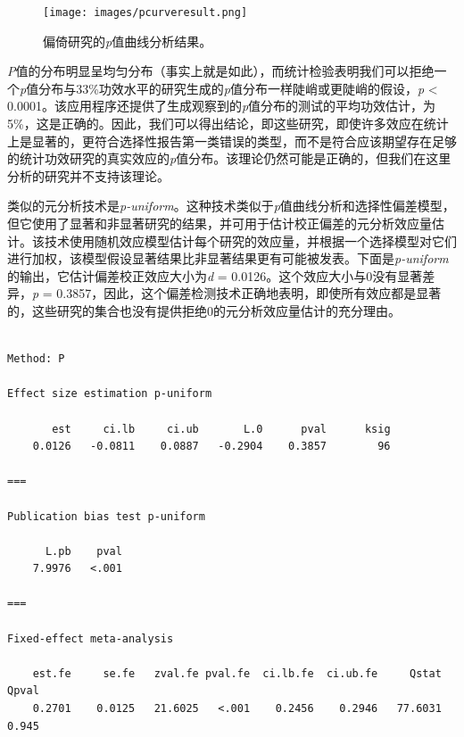 \documentclass[
  letterpaper,
  DIV=11,
  numbers=noendperiod]{scrreprt}
\newenvironment{Shaded}{\begin{snugshade}}{\end{snugshade}}
\newcommand{\AttributeTok}[1]{\textcolor[rgb]{0.40,0.45,0.13}{#1}}
\newcommand{\FunctionTok}[1]{\textcolor[rgb]{0.28,0.35,0.67}{#1}}
\newcommand{\NormalTok}[1]{\textcolor[rgb]{0.00,0.23,0.31}{#1}}
\newcommand{\SpecialCharTok}[1]{\textcolor[rgb]{0.37,0.37,0.37}{#1}}
\newcommand{\StringTok}[1]{\textcolor[rgb]{0.13,0.47,0.30}{#1}}
\begin{document}
\begin{figure}

{\centering \texttt{[image: images/pcurveresult.png]}

}

\caption{\label{fig-pcurveresult}偏倚研究的\emph{p}值曲线分析结果。}

\end{figure}

\emph{P}值的分布明显呈均匀分布（事实上就是如此），而统计检验表明我们可以拒绝一个\emph{p}值分布与33\%功效水平的研究生成的\emph{p}值分布一样陡峭或更陡峭的假设，\emph{p}
\textless{}
0.0001。该应用程序还提供了生成观察到的\emph{p}值分布的测试的平均功效估计，为5\%，这是正确的。因此，我们可以得出结论，即这些研究，即使许多效应在统计上是显著的，更符合选择性报告第一类错误的类型，而不是符合应该期望存在足够的统计功效研究的真实效应的\emph{p}值分布。该理论仍然可能是正确的，但我们在这里分析的研究并不支持该理论。

类似的元分析技术是\emph{p-uniform}。这种技术类似于\emph{p}值曲线分析和选择性偏差模型，但它使用了显著和非显著研究的结果，并可用于估计校正偏差的元分析效应量估计。该技术使用随机效应模型估计每个研究的效应量，并根据一个选择模型对它们进行加权，该模型假设显著结果比非显著结果更有可能被发表。下面是\emph{p-uniform}的输出，它估计偏差校正效应大小为\emph{d}
= 0.0126。这个效应大小与0没有显著差异，\emph{p} =
0.3857，因此，这个偏差检测技术正确地表明，即使所有效应都是显著的，这些研究的集合也没有提供拒绝0的元分析效应量估计的充分理由。

\begin{Shaded}
\end{Shaded}

\begin{verbatim}

Method: P

Effect size estimation p-uniform

       est     ci.lb     ci.ub       L.0      pval      ksig
    0.0126   -0.0811    0.0887   -0.2904    0.3857        96

===

Publication bias test p-uniform

      L.pb    pval
    7.9976   <.001

===

Fixed-effect meta-analysis

    est.fe     se.fe   zval.fe pval.fe  ci.lb.fe  ci.ub.fe     Qstat     Qpval
    0.2701    0.0125   21.6025   <.001    0.2456    0.2946   77.6031     0.945
\end{verbatim}
\end{document}
